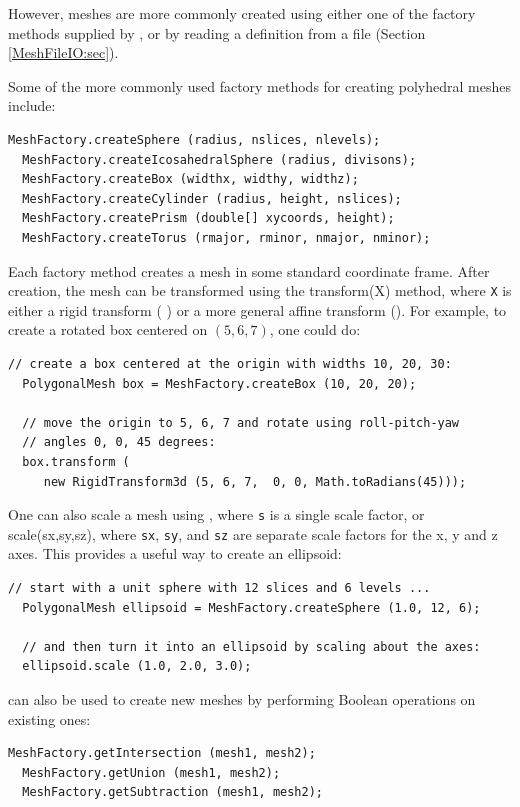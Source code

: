 However, meshes are more commonly created using either one of the
factory methods supplied by ,
or by reading a definition from a file (Section \ref{MeshFileIO:sec}).

Some of the more commonly used factory methods for creating polyhedral
meshes include:
%
\begin{lstlisting}[]
  MeshFactory.createSphere (radius, nslices, nlevels);
  MeshFactory.createIcosahedralSphere (radius, divisons);
  MeshFactory.createBox (widthx, widthy, widthz);
  MeshFactory.createCylinder (radius, height, nslices);
  MeshFactory.createPrism (double[] xycoords, height);
  MeshFactory.createTorus (rmajor, rminor, nmajor, nminor);
\end{lstlisting}
%
Each factory method creates a mesh in some standard coordinate
frame. After creation, the mesh can be transformed using the
%
{transform(X)} method, where {\tt X} is either a rigid transform (
) or a more general affine
transform ().
For example, to create a rotated box centered on $(5, 6, 7)$,
one could do:
%
\begin{lstlisting}[]
  // create a box centered at the origin with widths 10, 20, 30:
  PolygonalMesh box = MeshFactory.createBox (10, 20, 20);

  // move the origin to 5, 6, 7 and rotate using roll-pitch-yaw
  // angles 0, 0, 45 degrees:
  box.transform (
     new RigidTransform3d (5, 6, 7,  0, 0, Math.toRadians(45)));
\end{lstlisting}
%
One can also scale a mesh using
,
where {\tt s} is a single scale factor, or
%
{scale(sx,sy,sz)}, where {\tt sx}, {\tt sy}, and {\tt sz} are separate
scale factors for the x, y and z axes. This provides a useful way to
create an ellipsoid:
%
\begin{lstlisting}[]
   // start with a unit sphere with 12 slices and 6 levels ...
  PolygonalMesh ellipsoid = MeshFactory.createSphere (1.0, 12, 6);

  // and then turn it into an ellipsoid by scaling about the axes:
  ellipsoid.scale (1.0, 2.0, 3.0);
\end{lstlisting}
%
 can also be used to create
new meshes by performing Boolean operations on existing ones:
%
\begin{lstlisting}[]
  MeshFactory.getIntersection (mesh1, mesh2);
  MeshFactory.getUnion (mesh1, mesh2);
  MeshFactory.getSubtraction (mesh1, mesh2);
\end{lstlisting}
%

